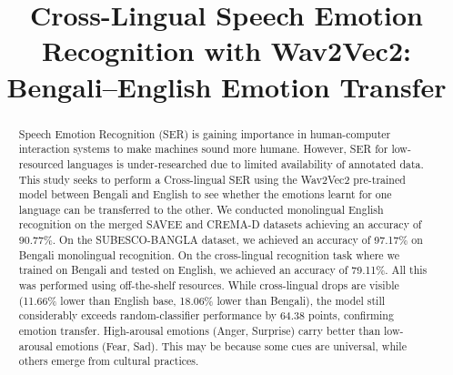 \documentclass[conference]{IEEEtran}
\begin{document}
\title{Cross-Lingual Speech Emotion Recognition with Wav2Vec2: Bengali--English Emotion Transfer}

\author{
}

\maketitle

\begin{abstract}
Speech Emotion Recognition (SER) is gaining importance in human-computer interaction
systems to make machines sound more humane. However, SER for low-resourced languages is
under-researched due to limited availability of annotated data. This study seeks to perform a
Cross-lingual SER using the Wav2Vec2 pre-trained model between Bengali and English to see
whether the emotions learnt for one language can be transferred to the other. We conducted
monolingual English recognition on the merged SAVEE and CREMA-D datasets achieving an
accuracy of 90.77\%. On the SUBESCO-BANGLA dataset, we achieved an accuracy of 97.17\%
on Bengali monolingual recognition. On the cross-lingual recognition task where we trained on
Bengali and tested on English, we achieved an accuracy of 79.11\%. All this was performed
using off-the-shelf resources. While cross-lingual drops are visible (11.66\% lower than
English base, 18.06\% lower than Bengali), the model still considerably exceeds
random-classifier performance by 64.38 points, confirming emotion transfer. High-arousal
emotions (Anger, Surprise) carry better than low-arousal emotions (Fear, Sad). This may be
because some cues are universal, while others emerge from cultural practices.
\end{abstract}
\end{document}
